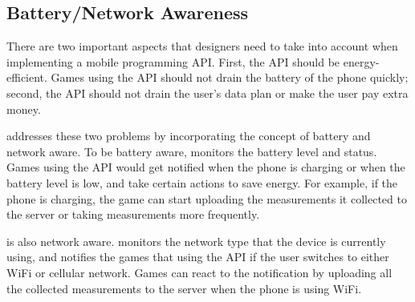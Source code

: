 \subsection{Battery/Network Awareness}
There are two important aspects that designers need to take into account when implementing a mobile 
programming API. First, the API should be energy-efficient. 
Games using the API should not drain the battery of the phone quickly; second, the API should
not drain the user's data plan or make the user pay extra money. 
 
\name{} addresses these two problems by incorporating the concept of battery and network aware. 
To be battery aware, \name{} monitors the battery level and status. Games using the API would get
notified when the phone is charging or when the battery level is low, and take certain actions
to save energy. For example, if the phone is charging, the game can start uploading the measurements 
it collected to the server or taking measurements more frequently. 

\name{} is also network aware. \name{} monitors the network type that the device is currently using, 
and notifies the games that using the API if the user switches to either WiFi or cellular network.
Games can react to the notification by uploading all the collected measurements to the server when
the phone is using WiFi.

